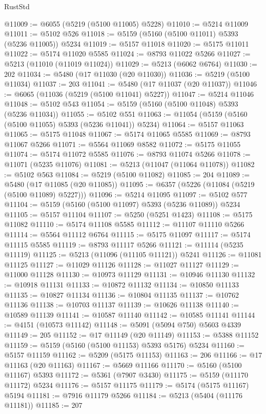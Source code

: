 \begin{lexlean}{RustStd}
\begin{coremodule}
@11009 := @6055 (@5219 (@5100 @11005) @5228)
@11010 := @5214 @11009
@11011 := @5102 @526
@11018 := @5159 (@5160 (@5100 @11011) @5393 (@5236 @11005)) @5234
@11019 := @5157 @11018
@11020 := @5175 @11011
@11022 := @5174 @11020 @5585
@11024 := @8793 @11022 @5266
@11027 := @5213 (@11010 (@11019 @11024))
@11029 := @5213 (@6062 @6764)
@11030 := 202
@11034 := @5480 (@17 @11030 (@20 @11030))
@11036 := @5219 (@5100 @11034)
@11037 := 203
@11041 := @5480 (@17 @11037 (@20 @11037))
@11046 := @6065 (@11036 (@5219 (@5100 @11041) @5227))
@11047 := @5214 @11046
@11048 := @5102 @543
@11054 := @5159 (@5160 (@5100 @11048) @5393 (@5236 @11034))
@11055 := @5102 @551
@11063 := @11054 (@5159 (@5160 (@5100 @11055) @5393 (@5236 @11041)) @5234)
@11064 := @5157 @11063
@11065 := @5175 @11048
@11067 := @5174 @11065 @5585
@11069 := @8793 @11067 @5266
@11071 := @5564 @11069 @8582
@11072 := @5175 @11055
@11074 := @5174 @11072 @5585
@11076 := @8793 @11074 @5266
@11078 := @11071 (@5235 @11076)
@11081 := @5213 (@11047 (@11064 @11078))
@11082 := @5102 @563
@11084 := @5219 (@5100 @11082)
@11085 := 204
@11089 := @5480 (@17 @11085 (@20 @11085))
@11095 := @6357 (@5226 (@11084 (@5219 (@5100 @11089) @5227)))
@11096 := @5214 @11095
@11097 := @5102 @577
@11104 := @5159 (@5160 (@5100 @11097) @5393 (@5236 @11089)) @5234
@11105 := @5157 @11104
@11107 := @5250 (@5251 @1423)
@11108 := @5175 @11082
@11110 := @5174 @11108 @5585
@11112 := @11107 @11110 @5266
@11114 := @5564 @11112 @6764
@11115 := @5175 @11097
@11117 := @5174 @11115 @5585
@11119 := @8793 @11117 @5266
@11121 := @11114 (@5235 @11119)
@11125 := @5213 (@11096 (@11105 @11121)) @5241
@11126 := @11081 @11125
@11127 := @11029 @11126
@11128 := @11027 @11127
@11129 := @11000 @11128
@11130 := @10973 @11129
@11131 := @10946 @11130
@11132 := @10918 @11131
@11133 := @10872 @11132
@11134 := @10850 @11133
@11135 := @10827 @11134
@11136 := @10804 @11135
@11137 := @10762 @11136
@11138 := @10703 @11137
@11139 := @10626 @11138
@11140 := @10589 @11139
@11141 := @10587 @11140
@11142 := @10585 @11141
@11144 := @4151 (@10573 @11142)
@11148 := @5091 (@5094 @750) @5603 @4339
@11149 := 205
@11152 := @17 @11149 (@20 @11149)
@11153 := @5388 @11152
@11159 := @5159 (@5160 (@5100 @11153) @5393 @5176) @5234
@11160 := @5157 @11159
@11162 := @5209 (@5175 @11153)
@11163 := 206
@11166 := @17 @11163 (@20 @11163)
@11167 := @5669 @11166
@11170 := @5160 (@5100 @11167) @5393
@11172 := @5361 (@7907 @3430)
@11175 := @5159 (@11170 @11172) @5234
@11176 := @5157 @11175
@11179 := @5174 (@5175 @11167) @5194
@11181 := @7916 @11179 @5266
@11184 := @5213 (@5404 (@11176 @11181))
@11185 := 207

\end{coremodule}
\end{lexlean}
